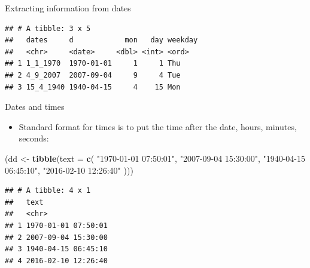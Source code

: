 \documentclass[ignorenonframetext,]{beamer}
\newenvironment{Shaded}{\begin{snugshade}}{\end{snugshade}}
\newcommand{\DataTypeTok}[1]{\textcolor[rgb]{0.13,0.29,0.53}{#1}}
\newcommand{\KeywordTok}[1]{\textcolor[rgb]{0.13,0.29,0.53}{\textbf{#1}}}
\newcommand{\NormalTok}[1]{#1}
\newcommand{\OperatorTok}[1]{\textcolor[rgb]{0.81,0.36,0.00}{\textbf{#1}}}
\newcommand{\StringTok}[1]{\textcolor[rgb]{0.31,0.60,0.02}{#1}}
\providecommand{\tightlist}{%
  \setlength{\itemsep}{0pt}\setlength{\parskip}{0pt}}
\begin{document}
\begin{frame}[fragile]{Extracting information from dates}
\protect\hypertarget{extracting-information-from-dates}{}

\begin{Shaded}
\end{Shaded}

\begin{verbatim}
## # A tibble: 3 x 5
##   dates     d            mon   day weekday
##   <chr>     <date>     <dbl> <int> <ord>  
## 1 1_1_1970  1970-01-01     1     1 Thu    
## 2 4_9_2007  2007-09-04     9     4 Tue    
## 3 15_4_1940 1940-04-15     4    15 Mon
\end{verbatim}

\end{frame}

\begin{frame}[fragile]{Dates and times}
\protect\hypertarget{dates-and-times-1}{}

\begin{itemize}
\tightlist
\item
  Standard format for times is to put the time after the date, hours,
  minutes, seconds:
\end{itemize}

\begin{Shaded}
\begin{Highlighting}[]
\NormalTok{(dd <-}\StringTok{ }\KeywordTok{tibble}\NormalTok{(}\DataTypeTok{text =} \KeywordTok{c}\NormalTok{(}
  \StringTok{"1970-01-01 07:50:01"}\NormalTok{, }\StringTok{"2007-09-04 15:30:00"}\NormalTok{,}
  \StringTok{"1940-04-15 06:45:10"}\NormalTok{, }\StringTok{"2016-02-10 12:26:40"}
\NormalTok{)))}
\end{Highlighting}
\end{Shaded}

\begin{verbatim}
## # A tibble: 4 x 1
##   text               
##   <chr>              
## 1 1970-01-01 07:50:01
## 2 2007-09-04 15:30:00
## 3 1940-04-15 06:45:10
## 4 2016-02-10 12:26:40
\end{verbatim}

\end{frame}
\end{document}
